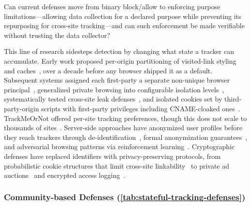 \begin{opbox}
Can current defenses move from binary block/allow to enforcing purpose limitations---allowing data collection for a declared purpose while preventing its repurposing for cross-site tracking---and can such enforcement be made verifiable without trusting the data collector?
\end{opbox}





%
This line of research sidesteps detection by changing what state a tracker can accumulate.
%
Early work proposed per-origin partitioning of visited-link styling and caches~\cite{jacksonProtectingBrowserState2006}, over a decade before any browser shipped it as a default.
%
Subsequent systems assigned each first-party a separate non-unique browser principal~\cite{panNotKnowWhat2015}, generalized private browsing into configurable isolation levels~\cite{xuUCognitoPrivateBrowsing2015}, systematically tested cross-site leak defenses~\cite{knittelXSinatorcomFormalModel2021}, and isolated cookies set by third-party-origin scripts with first-party privileges including CNAME-cloaked ones~\cite{nikkhahbahramiCookieGuardCharacterizingIsolating2025}.
%
TrackMeOrNot offered per-site tracking preferences, though this does not scale to thousands of sites~\cite{mengTrackMeOrNotEnablingFlexible2016,nisenoffDefiningBrokenUser2023}.
%
Server-side approaches have anonymized user profiles before they reach trackers through de-identification~\cite{zhengWebUserDeidentification2008}, formal anonymization guarantees~\cite{zhuAnonymizingUserProfiles2010}, and adversarial browsing patterns via reinforcement learning~\cite{zhangHARPOLearningSubvert2022}.
%
Cryptographic defenses have replaced identifiers with privacy-preserving protocols, from probabilistic cookie structures that limit cross-site linkability~\cite{morBloomCookiesWeb2015} to private ad auctions~\cite{zhongIbexPrivacypreservingAd2022} and encrypted access logging~\cite{ortegaperezEncryptedAccessLogging2025}.



\subsubsection{Community-based Defenses (\autoref{tab:stateful-tracking-defenses})}
\label{sec:stateful-defenses-community}


